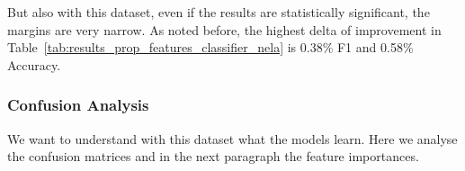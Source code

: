 








But also with this dataset, even if the results are statistically significant, the margins are very narrow.
As noted before, the highest delta of improvement in Table~\ref{tab:results_prop_features_classifier_nela} is 0.38\% F1 and 0.58\% Accuracy.

\subsubsection{Confusion Analysis}

We want to understand with this dataset what the models learn. Here we analyse the confusion matrices and in the next paragraph the feature importances.



